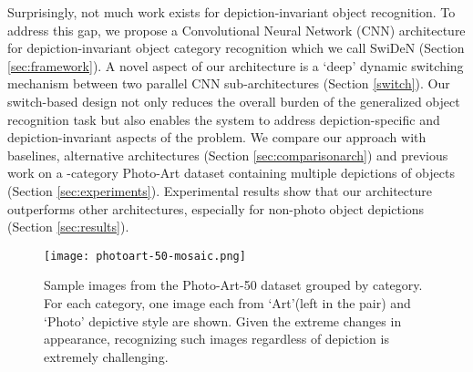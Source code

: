 \documentclass[preprint]{sig-alternate-05-2015}
\begin{document}
Surprisingly, not much work exists for depiction-invariant object recognition. To address this gap, we propose a Convolutional Neural Network (CNN) architecture for depiction-invariant object category recognition which we call SwiDeN (Section \ref{sec:framework}). A novel aspect of our architecture is a `deep' dynamic switching mechanism between two parallel CNN sub-architectures (Section \ref{switch}). Our switch-based design not only reduces the overall burden of the generalized object recognition task but also enables the system to address depiction-specific and depiction-invariant aspects of the problem. We compare our approach with baselines,  alternative architectures (Section \ref{sec:comparisonarch}) and previous work on a -category Photo-Art dataset containing multiple depictions of objects (Section \ref{sec:experiments}). Experimental results show that our architecture outperforms other architectures, especially for non-photo object depictions (Section \ref{sec:results}). 

\begin{figure}[!tbp]
    \centering    
		\texttt{[image: photoart-50-mosaic.png]}
		\caption{Sample images from the Photo-Art-50 dataset grouped by category. For each category, one image each from `Art'(left in the pair) and `Photo' depictive style are shown. Given the extreme changes in appearance, recognizing such images regardless of depiction is extremely challenging.} 
		\label{fig:datasetpic}    
\end{figure}

\begin{figure*}[ht]
	\mbox{}\hspace{0.3cm}\mbox{}\hspace{0.3cm}\mbox{}\hspace{0.3cm}\caption{Our proposed architecture SwiDeN is shown in \ref{fig:3imgs}(c). The depictive style of the  cartoon-ish horse image is  determined as `Art' by  \textsc{Switch} (purple block). An associated switch layer relays it to the `Art' sub-network (green block). The latter's output is passed via a series of shared layers and finally, a softmax classifier generates the label \texttt{Horse}. Figure  \ref{fig:3imgs}(a) is the baseline architecture. Figure \ref{fig:3imgs}(b) (GRN) is a modification of architecture proposed by Ganin et al~\cite{ganin2015unsupervised}. VGG-19~\cite{Simonyan14c} is used as the base network for all architectures.}
\label{fig:3imgs}
\end{figure*}
\end{document}
